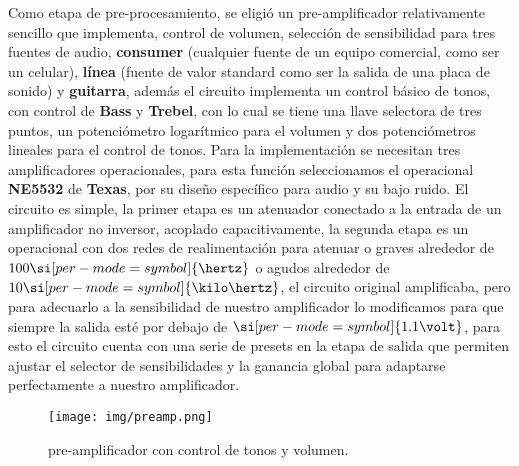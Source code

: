 
Como etapa de pre-procesamiento, se eligió un pre-amplificador relativamente sencillo que implementa, control de volumen, selección de sensibilidad para tres fuentes de audio, \textbf{consumer} (cualquier fuente de un equipo comercial, como ser un celular), \textbf{línea} (fuente de valor standard como ser la salida de una placa de sonido) y \textbf{guitarra}, además el circuito implementa un control básico de tonos, con control de \textbf{Bass} y \textbf{Trebel}, con lo cual se tiene una llave selectora de tres puntos, un potenciómetro logarítmico para el volumen y dos potenciómetros lineales para el control de tonos. Para la implementación se necesitan tres amplificadores operacionales, para esta función seleccionamos el operacional \textbf{NE5532} de \textbf{Texas}, por su diseño específico para audio y su bajo ruido. El circuito es simple, la primer etapa es un atenuador conectado a la entrada de un amplificador no inversor, acoplado capacitivamente, la segunda etapa es un operacional con dos redes de realimentación para atenuar o graves alrededor de $100 \si[per-mode=symbol]{\hertz}$ o agudos alrededor de $10 \si[per-mode=symbol]{\kilo\hertz}$, el circuito original amplificaba, pero para adecuarlo a la sensibilidad de nuestro amplificador lo modificamos para que siempre la salida esté por debajo de $\si[per-mode=symbol]{1.1 \volt}$, para esto el circuito cuenta con una serie de presets en la etapa de salida que permiten ajustar el selector de sensibilidades y la ganancia global para adaptarse perfectamente a nuestro amplificador.


\vfill

\clearpage


\begin{figure}[H]
	\centering
	\texttt{[image: img/preamp.png]}
	\caption{pre-amplificador con control de tonos y volumen.}
	\label{fig:power_supply}
\end{figure}